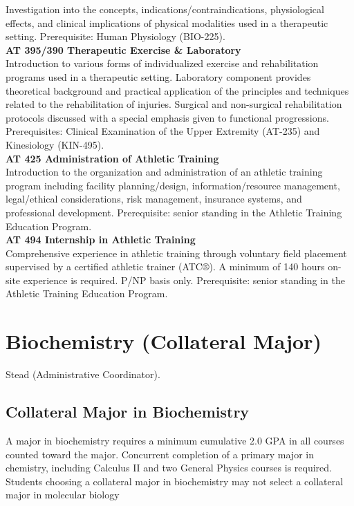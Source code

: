 \documentclass[
  letterpaper,
]{scrbook}
\begin{document}
Investigation into the concepts, indications/contraindications,
physiological effects, and clinical implications of physical modalities
used in a therapeutic setting. Prerequisite: Human Physiology
(BIO-225).\\
\textbf{AT 395/390 Therapeutic Exercise \& Laboratory}\\
Introduction to various forms of individualized exercise and
rehabilitation programs used in a therapeutic setting. Laboratory
component provides theoretical background and practical application of
the principles and techniques related to the rehabilitation of injuries.
Surgical and non-surgical rehabilitation protocols discussed with a
special emphasis given to functional progressions. Prerequisites:
Clinical Examination of the Upper Extremity (AT-235) and Kinesiology
(KIN-495).\\
\textbf{AT 425 Administration of Athletic Training}\\
Introduction to the organization and administration of an athletic
training program including facility planning/design,
information/resource management, legal/ethical considerations, risk
management, insurance systems, and professional development.
Prerequisite: senior standing in the Athletic Training Education
Program.\\
\textbf{AT 494 Internship in Athletic Training}\\
Comprehensive experience in athletic training through voluntary field
placement supervised by a certified athletic trainer (ATC®). A minimum
of 140 hours on-site experience is required. P/NP basis only.
Prerequisite: senior standing in the Athletic Training Education
Program.

\section{Biochemistry (Collateral Major)}\label{sec-biochemistry}

Stead (Administrative Coordinator).

\subsection{Collateral Major in
Biochemistry}\label{collateral-major-in-biochemistry}

A major in biochemistry requires a minimum cumulative 2.0 GPA in all
courses counted toward the major. Concurrent completion of a primary
major in chemistry, including Calculus II and two General Physics
courses is required. Students choosing a collateral major in
biochemistry may not select a collateral major in molecular biology
\end{document}
